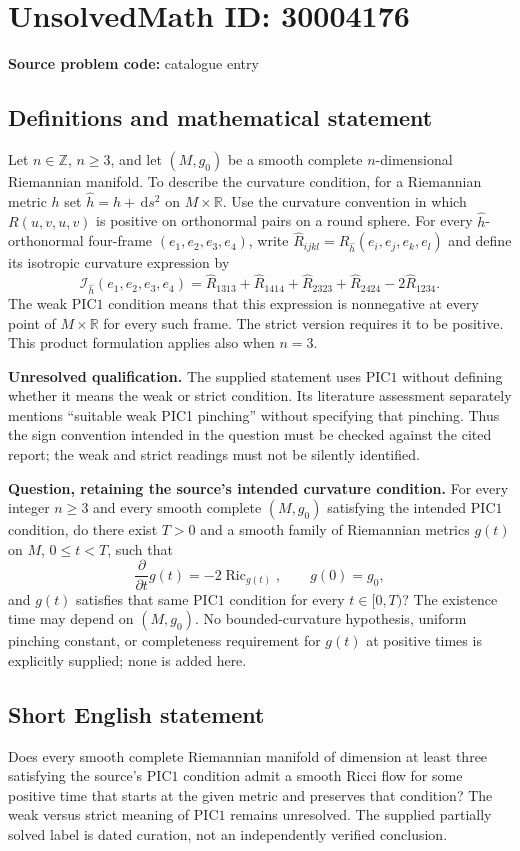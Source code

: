 \documentclass[11pt]{article}
\newcommand{\Z}{\mathbb{Z}}
\newcommand{\R}{\mathbb{R}}
\newcommand{\dd}{\,\mathrm{d}}
\begin{document}
\section*{UnsolvedMath ID: 30004176}
\textbf{Source problem code:} catalogue entry
\subsection{Definitions and mathematical statement}
Let \(n\in\Z\), \(n\geq3\), and let \((M,g_0)\) be a smooth complete \(n\)-dimensional Riemannian manifold. To describe the curvature condition, for a Riemannian metric \(h\) set \(\widehat h=h+\dd s^2\) on \(M\times\R\). Use the curvature convention in which \(R(u,v,u,v)\) is positive on orthonormal pairs on a round sphere. For every \(\widehat h\)-orthonormal four-frame \((e_1,e_2,e_3,e_4)\), write \(\widehat R_{ijkl}=R_{\widehat h}(e_i,e_j,e_k,e_l)\) and define its isotropic curvature expression by
\[
\mathcal I_{\widehat h}(e_1,e_2,e_3,e_4)
=\widehat R_{1313}+\widehat R_{1414}+\widehat R_{2323}+\widehat R_{2424}-2\widehat R_{1234}.
\]
The weak \(\mathrm{PIC1}\) condition means that this expression is nonnegative at every point of \(M\times\R\) for every such frame. The strict version requires it to be positive. This product formulation applies also when \(n=3\).

\textbf{Unresolved qualification.} The supplied statement uses \(\mathrm{PIC1}\) without defining whether it means the weak or strict condition. Its literature assessment separately mentions ``suitable weak PIC1 pinching'' without specifying that pinching. Thus the sign convention intended in the question must be checked against the cited report; the weak and strict readings must not be silently identified.

\textbf{Question, retaining the source's intended curvature condition.} For every integer \(n\geq3\) and every smooth complete \((M,g_0)\) satisfying the intended \(\mathrm{PIC1}\) condition, do there exist \(T>0\) and a smooth family of Riemannian metrics \(g(t)\) on \(M\), \(0\leq t<T\), such that
\[
\frac{\partial}{\partial t}g(t)=-2\operatorname{Ric}_{g(t)},\qquad g(0)=g_0,
\]
and \(g(t)\) satisfies that same \(\mathrm{PIC1}\) condition for every \(t\in[0,T)\)? The existence time may depend on \((M,g_0)\). No bounded-curvature hypothesis, uniform pinching constant, or completeness requirement for \(g(t)\) at positive times is explicitly supplied; none is added here.
\subsection{Short English statement}
Does every smooth complete Riemannian manifold of dimension at least three satisfying the source's \(\mathrm{PIC1}\) condition admit a smooth Ricci flow for some positive time that starts at the given metric and preserves that condition? The weak versus strict meaning of \(\mathrm{PIC1}\) remains unresolved. The supplied partially solved label is dated curation, not an independently verified conclusion.
\end{document}
